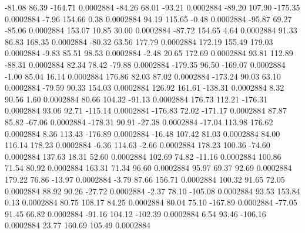       -81.08       86.39     -164.71     0.0002884
      -84.26       68.01      -93.21     0.0002884
      -89.20      107.90     -175.35     0.0002884
       -7.96      154.66        0.38     0.0002884
       94.19      115.65       -0.48     0.0002884
      -95.87       69.27      -85.06     0.0002884
      153.07       10.85       30.00     0.0002884
      -87.72      154.65        4.64     0.0002884
       91.33       86.83      168.35     0.0002884
      -80.32       63.56      177.79     0.0002884
      172.19      155.49      179.03     0.0002884
       -9.83       85.51       98.53     0.0002884
       -2.48       20.65      172.69     0.0002884
       93.81      112.89      -88.31     0.0002884
       82.34       78.42      -79.88     0.0002884
     -179.35       96.50     -169.07     0.0002884
       -1.00       85.04       16.14     0.0002884
      176.86       82.03       87.02     0.0002884
     -173.24       90.03       63.10     0.0002884
      -79.59       90.33      154.03     0.0002884
      126.92      161.61     -138.31     0.0002884
        8.32       90.56        1.60     0.0002884
       80.66      104.32      -91.13     0.0002884
      176.73      112.21     -176.31     0.0002884
       93.06       92.71     -115.14     0.0002884
     -176.83       72.02     -171.17     0.0002884
       87.87       85.82      -67.06     0.0002884
     -178.31       90.91      -27.38     0.0002884
      -17.04      113.98      176.62     0.0002884
        8.36      113.43     -176.89     0.0002884
      -16.48      107.42       81.03     0.0002884
       84.00      116.14      178.23     0.0002884
       -6.36      114.63       -2.66     0.0002884
      178.23      100.36      -74.60     0.0002884
      137.63       18.31       52.60     0.0002884
      102.69       74.82      -11.16     0.0002884
      100.86       71.54       80.92     0.0002884
      163.31       71.34       96.60     0.0002884
       95.97       69.37       92.69     0.0002884
      179.22       76.86      -13.97     0.0002884
       -3.79       87.66      156.71     0.0002884
      100.32       91.65       72.05     0.0002884
       88.92       90.26      -27.72     0.0002884
       -2.37       78.10     -105.08     0.0002884
       93.53      153.84        0.13     0.0002884
       80.75      108.17       84.25     0.0002884
       80.04       75.10     -167.89     0.0002884
      -77.05       91.45       66.82     0.0002884
      -91.16      104.12     -102.39     0.0002884
        6.54       93.46     -106.16     0.0002884
       23.77      160.69      105.49     0.0002884
